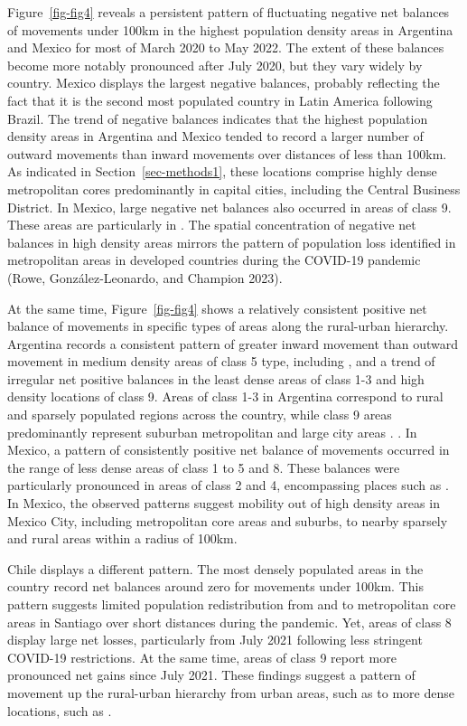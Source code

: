 \documentclass[
  10pt,
  letterpaper,
  DIV=11,
  numbers=noendperiod]{scrartcl}
\begin{document}
Figure~\ref{fig-fig4} reveals a persistent pattern of fluctuating
negative net balances of movements under 100km in the highest population
density areas in Argentina and Mexico for most of March 2020 to May
2022. The extent of these balances become more notably pronounced after
July 2020, but they vary widely by country. Mexico displays the largest
negative balances, probably reflecting the fact that it is the second
most populated country in Latin America following Brazil. The trend of
negative balances indicates that the highest population density areas in
Argentina and Mexico tended to record a larger number of outward
movements than inward movements over distances of less than 100km. As
indicated in Section~\ref{sec-methods1}, these locations comprise highly
dense metropolitan cores predominantly in capital cities, including the
Central Business District. In Mexico, large negative net balances also
occurred in areas of class 9. These areas are particularly in . The
spatial concentration of negative net balances in high density areas
mirrors the pattern of population loss identified in metropolitan areas
in developed countries during the COVID-19 pandemic (Rowe,
González-Leonardo, and Champion 2023).

At the same time, Figure~\ref{fig-fig4} shows a relatively consistent
positive net balance of movements in specific types of areas along the
rural-urban hierarchy. Argentina records a consistent pattern of greater
inward movement than outward movement in medium density areas of class 5
type, including , and a trend of irregular net positive balances in the
least dense areas of class 1-3 and high density locations of class 9.
Areas of class 1-3 in Argentina correspond to rural and sparsely
populated regions across the country, while class 9 areas predominantly
represent suburban metropolitan and large city areas . . In Mexico, a
pattern of consistently positive net balance of movements occurred in
the range of less dense areas of class 1 to 5 and 8. These balances were
particularly pronounced in areas of class 2 and 4, encompassing places
such as . In Mexico, the observed patterns suggest mobility out of high
density areas in Mexico City, including metropolitan core areas and
suburbs, to nearby sparsely and rural areas within a radius of 100km.

Chile displays a different pattern. The most densely populated areas in
the country record net balances around zero for movements under 100km.
This pattern suggests limited population redistribution from and to
metropolitan core areas in Santiago over short distances during the
pandemic. Yet, areas of class 8 display large net losses, particularly
from July 2021 following less stringent COVID-19 restrictions. At the
same time, areas of class 9 report more pronounced net gains since July
2021. These findings suggest a pattern of movement up the rural-urban
hierarchy from urban areas, such as to more dense locations, such as .
\end{document}
